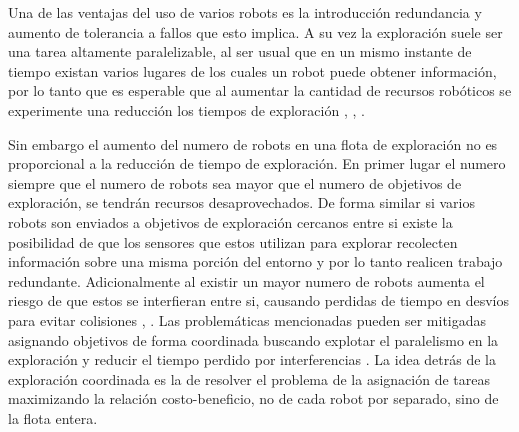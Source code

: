 Una de las ventajas del uso de varios robots es la introducción redundancia y aumento de tolerancia a fallos que esto implica. A su vez la exploración suele ser una tarea altamente paralelizable, al ser usual que en un mismo instante de tiempo existan varios lugares de los cuales un robot puede obtener información, por lo tanto que es esperable que al aumentar la cantidad de recursos robóticos se experimente una reducción los tiempos de exploración \cite{cao1997cooperative}, \cite{dudek1996taxonomy}, \cite{guzzoni1997many}. 

Sin embargo el aumento del numero de robots en una flota de exploración no es proporcional a la reducción de tiempo de exploración. En primer lugar el numero  siempre que el numero de robots sea mayor que el numero de objetivos de exploración, se tendrán recursos desaprovechados. De forma similar si varios robots son enviados a objetivos de exploración cercanos entre si existe la posibilidad de que los sensores que estos utilizan para explorar recolecten información sobre una misma porción del entorno y por lo tanto realicen trabajo redundante. Adicionalmente al existir un mayor numero de robots aumenta el riesgo de que estos se interfieran entre si, causando perdidas de tiempo en desvíos para evitar colisiones \cite{guzzoni1997many}, \cite{goldberg1997interference}. %
Las problemáticas mencionadas pueden ser mitigadas asignando objetivos de forma coordinada buscando explotar el paralelismo en la exploración y reducir el tiempo perdido por interferencias \cite{nieto2014coordination}. La idea detrás de la exploración coordinada es la de resolver el problema de la asignación de tareas maximizando la relación costo-beneficio, no de cada robot por separado, sino  de la flota entera.




